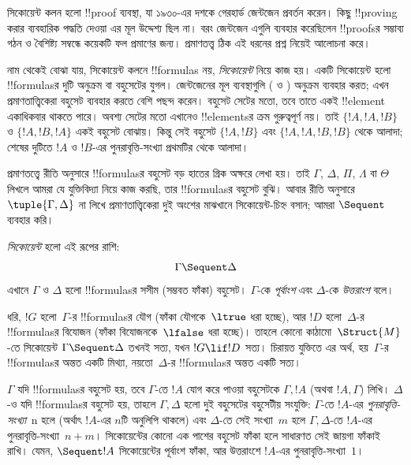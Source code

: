 \documentclass[../../../include/open-logic-section]{subfiles}
\begin{document}


সিকোয়েন্ট কলন হলো !!{proof} ব্যবস্থা, যা
১৯৩০-এর দশকে গেরহার্ড জেন্টজেন প্রবর্তন করেন।
কিছু !!{proving} করার ব্যবহারিক পদ্ধতি দেওয়া
এর মূল উদ্দেশ্য ছিল না। বরং জেন্টজেন
এগুলি ব্যবহার করেছিলেন !!{proof}sর সম্ভাব্য
গঠন ও বৈশিষ্ট্য সম্বন্ধে কয়েকটি ফল প্রমাণের
জন্য। প্রমাণতত্ত্ব ঠিক এই ধরনের প্রশ্ন নিয়েই
আলোচনা করে।

নাম থেকেই বোঝা যায়, সিকোয়েন্ট কলনে
!!{formula}s নয়, \emph{সিকোয়েন্ট} নিয়ে
কাজ হয়। একটি সিকোয়েন্ট হলো !!{formula}sর
দুটি অনুক্রম বা বহুসেটের যুগল। জেন্টজেনের
মূল ব্যবস্থাগুলি ( ও )
অনুক্রম ব্যবহার করত; এখন প্রমাণতাত্ত্বিকেরা
বহুসেট ব্যবহার করতে বেশি পছন্দ করেন।
বহুসেট সেটের মতো, তবে তাতে একই
!!{element} একাধিকবার থাকতে পারে।
অবশ্য সেটের মতো এখানেও !!{element}sর
ক্রম গুরুত্বপূর্ণ নয়। তাই
$\{!A, !A, !B\}$ ও $\{!A, !B, !A\}$
একই বহুসেট বোঝায়। কিন্তু সেই
বহুসেট $\{!A, !B\}$ এবং
$\{!A, !A, !B, !B\}$ থেকে আলাদা;
শেষের দুটিতে $!A$ ও $!B$-এর
পুনরাবৃত্তি-সংখ্যা প্রথমটির থেকে আলাদা।

প্রমাণতত্ত্বে রীতি অনুসারে !!{formula}sর
বহুসেট বড় হাতের গ্রিক অক্ষরে লেখা হয়।
তাই $\Gamma$, $\Delta$, $\Pi$,
$\Lambda$ বা $\Theta$ লিখলে আমরা
যে যুক্তিবিদ্যা নিয়ে কাজ করছি,
তার !!{formula}sর বহুসেট বুঝি।
আবার রীতি অনুসারে
$\tuple{\Gamma, \Delta}$ না লিখে
প্রমাণতাত্ত্বিকেরা দুই অংশের মাঝখানে
সিকোয়েন্ট-চিহ্ন বসান; আমরা
$\Sequent$ ব্যবহার করি।

\begin{defn}[সিকোয়েন্ট]
\emph{সিকোয়েন্ট} হলো এই রূপের রাশি:
\[
\Gamma \Sequent \Delta
\]
এখানে $\Gamma$ ও $\Delta$ হলো
!!{formula}sর সসীম (সম্ভবত ফাঁকা)
বহুসেট। $\Gamma$-কে \emph{পূর্বাংশ}
এবং $\Delta$-কে \emph{উত্তরাংশ} বলে।
\end{defn}

ধরি, $!G$ হলো~$\Gamma$-র
!!{formula}sর যৌগ
(ফাঁকা যৌগকে~$\ltrue$ ধরা হচ্ছে),
আর $!D$ হলো~$\Delta$-র
!!{formula}sর বিযোজন
(ফাঁকা বিযোজনকে~$\lfalse$ ধরা হচ্ছে)।
তাহলে কোনো কাঠামো~$\Struct{M}$-তে
সিকোয়েন্ট $\Gamma \Sequent \Delta$
তখনই সত্য, যখন $!G \lif !D$ সত্য।
চিরায়ত যুক্তিতে এর অর্থ,
হয়~$\Gamma$-র !!{formula}sর
অন্তত একটি মিথ্যা,
নয়তো~$\Delta$-র !!{formula}sর
অন্তত একটি সত্য।

$\Gamma$ যদি !!{formula}sর বহুসেট হয়,
তবে $\Gamma$-তে $!A$ যোগ করে পাওয়া
বহুসেটকে $\Gamma, !A$ (অথবা
$!A, \Gamma$) লিখি। $\Delta$-ও
যদি !!{formula}sর বহুসেট হয়,
তাহলে $\Gamma, \Delta$ হলো দুই
বহুসেটের বহুসেটীয় সংযুক্তি:
$\Gamma$-তে $!A$-এর
\emph{পুনরাবৃত্তি-সংখ্যা}~n হলে
(অর্থাৎ $!A$-এর $n$টি অনুলিপি থাকলে)
এবং $\Delta$-তে সেই সংখ্যা~$m$
হলে $\Gamma, \Delta$-তে $!A$-এর
পুনরাবৃত্তি-সংখ্যা~$n+m$।
সিকোয়েন্টের কোনো এক পাশের
বহুসেট ফাঁকা হলে সাধারণত
সেই জায়গা ফাঁকাই রাখি।
যেমন, $\Sequent !A$ সিকোয়েন্টের
পূর্বাংশ ফাঁকা, আর উত্তরাংশে
$!A$-এর পুনরাবৃত্তি-সংখ্যা~$1$।
\end{document}
